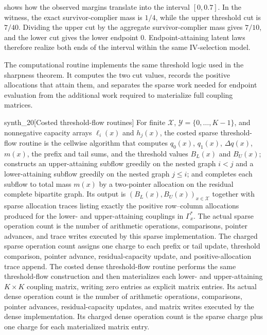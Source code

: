 \documentclass[11pt]{article}
\begin{document}
 shows how the observed margins translate into the interval \([0,0.7]\).  In the witness, the exact survivor-complier mass is \(1/4\), while the upper threshold cut is \(7/40\).  Dividing the upper cut by the aggregate survivor-complier mass gives \(7/10\), and the lower cut gives the lower endpoint \(0\).  Endpoint-attaining latent laws therefore realize both ends of the interval within the same IV-selection model.

The computational routine implements the same threshold logic used in the sharpness theorem.  It computes the two cut values, records the positive allocations that attain them, and separates the sparse work needed for endpoint evaluation from the additional work required to materialize full coupling matrices.

\begin{definitionv}{synth_20}[Costed threshold-flow routines]
For finite \(\mathcal X\), \(\mathcal Y=\{0,\ldots,K-1\}\), and nonnegative capacity arrays \(\ell_i(x)\) and \(h_j(x)\), the costed sparse threshold-flow routine is the cellwise algorithm that computes \(q_0(x)\), \(q_1(x)\), \(\Delta q(x)\), \(m(x)\), the prefix and tail sums, and the threshold values \(B_L(x)\) and \(B_U(x)\); constructs an upper-attaining subflow greedily on the nested graph \(i<j\) and a lower-attaining subflow greedily on the nested graph \(j\le i\); and completes each subflow to total mass \(m(x)\) by a two-pointer allocation on the residual complete bipartite graph. Its output is \((B_L(x),B_U(x))_{x\in\mathcal X}\) together with sparse allocation traces listing exactly the positive row--column allocations produced for the lower- and upper-attaining couplings in \(\Gamma_x^{\ast}\). The actual sparse operation count is the number of arithmetic operations, comparisons, pointer advances, and trace writes executed by this sparse implementation. The charged sparse operation count assigns one charge to each prefix or tail update, threshold comparison, pointer advance, residual-capacity update, and positive-allocation trace append. The costed dense threshold-flow routine performs the same threshold-flow construction and then materializes each lower- and upper-attaining \(K\times K\) coupling matrix, writing zero entries as explicit matrix entries. Its actual dense operation count is the number of arithmetic operations, comparisons, pointer advances, residual-capacity updates, and matrix writes executed by the dense implementation. Its charged dense operation count is the sparse charge plus one charge for each materialized matrix entry.
\end{definitionv}
\end{document}
